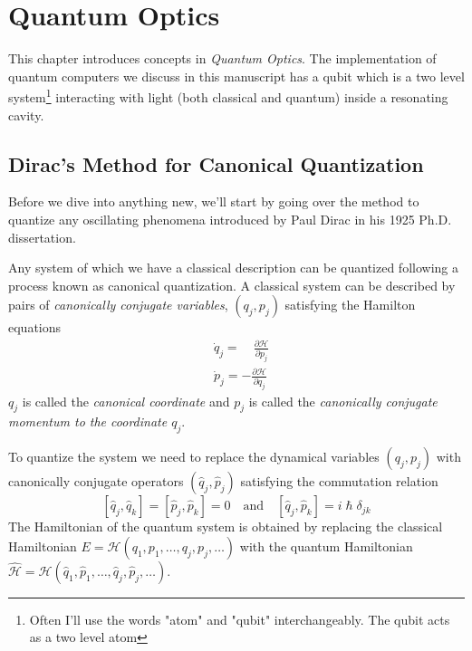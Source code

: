 \chapter{Quantum Optics} \label{chap:quantum-optics}

This chapter introduces concepts in \textit{Quantum Optics}. The implementation of quantum computers we discuss in this manuscript has a qubit which is a two level system\footnote{Often I'll use the words "atom" and "qubit" interchangeably. The qubit acts as a two level atom} interacting with light (both classical and quantum) inside a resonating cavity.

\section{Dirac's Method for Canonical Quantization}

Before we dive into anything new, we'll start by going over the method to quantize any oscillating phenomena introduced by Paul Dirac in his 1925 Ph.D. dissertation.

Any system of which we have a classical description can be quantized following a process known as canonical quantization. A classical system can be described by pairs of \textit{canonically conjugate variables}, $ (q_j, p_j)$ satisfying the Hamilton equations
\begin{align*}
    &\dot{q}_j =\quad \frac{\partial \mathcal{H}}{\partial p_j} \\
    &\dot{p}_j = -\frac{\partial \mathcal{H}}{\partial q_j}
\end{align*}
$q_j$ is called    the \textit{canonical coordinate} and $p_j$ is called the \textit{canonically conjugate momentum to the coordinate $q_j$}.

To quantize the system we need to replace the dynamical variables $ (q_j, p_j)$ with canonically conjugate operators $ (\hat{q}_j, \hat{p}_j)$ satisfying the commutation relation 
\[
[\hat{q}_j, \hat{q}_k] = [\hat{p}_j, \hat{p}_k] = 0 \quad  \text{and} \quad [\hat{q}_j, \hat{p}_k] = i\hslash \delta_{jk}
\]
The Hamiltonian of the quantum system is obtained by replacing the classical Hamiltonian $E = \mathcal{H} (q_1,p_1, \dots ,q_j, p_j, \dots)$ with the quantum Hamiltonian $\hat{\mathcal{H}} = \mathcal{H} (\hat{q}_1,\hat{p}_1, \dots ,\hat{q}_j, \hat{p}_j, \dots)$. 

